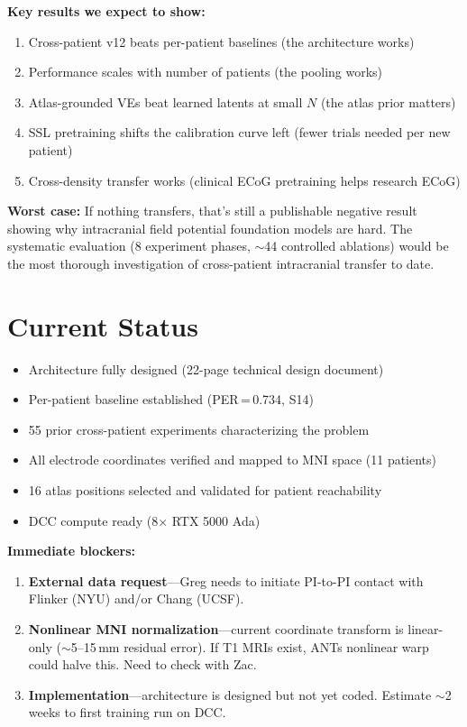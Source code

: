\documentclass[11pt,letterpaper]{article}
\begin{document}
\textbf{Key results we expect to show:}

\begin{enumerate}[leftmargin=2em]
    \item Cross-patient v12 beats per-patient baselines (the architecture works)
    \item Performance scales with number of patients (the pooling works)
    \item Atlas-grounded VEs beat learned latents at small $N$ (the atlas prior matters)
    \item SSL pretraining shifts the calibration curve left (fewer trials needed per new patient)
    \item Cross-density transfer works (clinical ECoG pretraining helps research \textmu ECoG)
\end{enumerate}

\textbf{Worst case:} If nothing transfers, that's still a publishable negative result showing why intracranial field potential foundation models are hard. The systematic evaluation (8 experiment phases, ${\sim}$44 controlled ablations) would be the most thorough investigation of cross-patient intracranial transfer to date.


\section{Current Status}

\begin{itemize}[leftmargin=2em]
    \item Architecture fully designed (22-page technical design document)
    \item Per-patient baseline established (PER\,=\,0.734, S14)
    \item 55 prior cross-patient experiments characterizing the problem
    \item All electrode coordinates verified and mapped to MNI space (11 patients)
    \item 16 atlas positions selected and validated for patient reachability
    \item DCC compute ready (8$\times$ RTX 5000 Ada)
\end{itemize}

\textbf{Immediate blockers:}

\begin{enumerate}[leftmargin=2em]
    \item \textbf{External data request}---Greg needs to initiate PI-to-PI contact with Flinker (NYU) and/or Chang (UCSF).
    \item \textbf{Nonlinear MNI normalization}---current coordinate transform is linear-only (${\sim}$5--15\,mm residual error). If T1 MRIs exist, ANTs nonlinear warp could halve this. Need to check with Zac.
    \item \textbf{Implementation}---architecture is designed but not yet coded. Estimate ${\sim}$2 weeks to first training run on DCC.
\end{enumerate}
\end{document}
